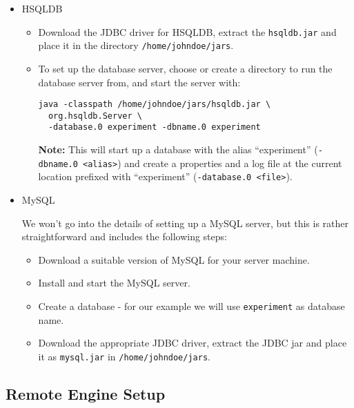 \begin{itemize}
	\item HSQLDB
	
		\begin{itemize}
			\item Download the JDBC driver for HSQLDB, extract the \texttt{hsqldb.jar} and place it in the directory \texttt{/home/johndoe/jars}.
			
			\item To set up the database server, choose or create a directory to run the database server from, and start the server with:

				\begin{verbatim}
java -classpath /home/johndoe/jars/hsqldb.jar \
  org.hsqldb.Server \
  -database.0 experiment -dbname.0 experiment
				\end{verbatim}
				
				\textbf{Note:} This will start up a database with the alias ``experiment'' (\texttt{-dbname.0 <alias>}) and create a properties and a log file at the current location prefixed with ``experiment'' (\texttt{-database.0 <file>}).
				
		\end{itemize}
		
	\item MySQL
	
We won't go into the details of setting up a MySQL server, but this is rather straightforward and includes the following steps:

		\begin{itemize}
  			\item Download a suitable version of MySQL for your server machine.
  			\item Install and start the MySQL server.
  			\item Create a database - for our example we will use \texttt{experiment} as database name.
  			\item Download the appropriate JDBC driver, extract the JDBC jar and place it as \texttt{mysql.jar} in \texttt{/home/johndoe/jars}.
		\end{itemize}
		
\end{itemize}

\subsection{Remote Engine Setup}

